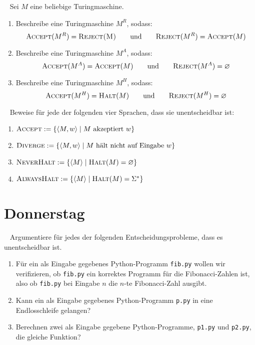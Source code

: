 \documentclass{uebung_cs}
\begin{document}
\begin{aufgabe}[Turingmaschinen]\
	Sei $M$ eine beliebige Turingmaschine.
	\begin{enumerate}
		\item Beschreibe eine Turingmaschine $M^R$, sodass:
		$$\textsc{Accept}(M^R) = \textsc{Reject(M)} \qquad \text{und} \qquad \textsc{Reject}(M^R) = \textsc{Accept}(M)$$
		
		\item Beschreibe eine Turingmaschine $M^A$, sodass:
		$$\textsc{Accept}(M^A) = \textsc{Accept}(M) \qquad \text{und} \qquad \textsc{Reject}(M^A) = \varnothing$$
		
		\item Beschreibe eine Turingmaschine $M^H$, sodass:
		$$\textsc{Accept}(M^H) = \textsc{Halt}(M) \qquad \text{und} \qquad \textsc{Reject}(M^H) = \varnothing$$
	\end{enumerate}
\end{aufgabe}

\begin{aufgabe}[Entscheidbarkeit I]\
	Beweise für jede der folgenden vier Sprachen, dass sie unentscheidbar ist:
	\begin{enumerate}
		\item $\textsc{Accept} := \{\langle M,w\rangle \;|\; M \text{ akzeptiert } w\}$
		\item $\textsc{Diverge} := \{\langle M,w\rangle \;|\; M \text{ hält nicht auf Eingabe } w\}$
		\item $\textsc{NeverHalt} := \{\langle M \rangle \;|\; \textsc{Halt}(M) = \varnothing\}$
		\item $\textsc{AlwaysHalt} := \{\langle M \rangle \;|\; \textsc{Halt}(M) = \Sigma^{\ast}\}$
	\end{enumerate}
\end{aufgabe}

\section*{Donnerstag}

\begin{aufgabe}[Entscheidbarkeit II]\
	Argumentiere für jedes der folgenden Entscheidungsprobleme, dass es unentscheidbar ist.
	\begin{enumerate}
		\item Für ein als Eingabe gegebenes Python-Programm \texttt{fib.py} wollen wir verifizieren, ob \texttt{fib.py} ein korrektes Programm für die Fibonacci-Zahlen ist, also ob \texttt{fib.py} bei Eingabe $n$ die $n$-te Fibonacci-Zahl ausgibt.
		\item Kann ein als Eingabe gegebenes Python-Programm \texttt{p.py} in eine Endlosschleife gelangen?
		\item Berechnen zwei als Eingabe gegebene Python-Programme, \texttt{p1.py} und \texttt{p2.py}, die gleiche Funktion?
	\end{enumerate}
\end{aufgabe}
\end{document}
